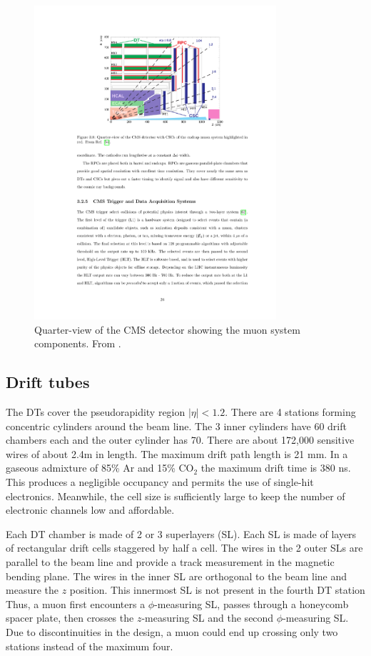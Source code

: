 \begin{figure}[hbtp]
\centering
\includegraphics[width=0.8\textwidth]{figures/cms_muon_systems.pdf}
\caption{
Quarter-view of the CMS detector showing the muon system components. 
From \cite{Chatrchyan:2008aa}.
}
\label{fig:muonsystem}
\end{figure}

\subsection{Drift tubes}
The DTs cover the pseudorapidity region $|\eta|<1.2$.
There are 4 stations forming concentric cylinders around the beam line.
The 3 inner cylinders have 60 drift chambers each and the outer cylinder has 70.
There are about 172,000 sensitive wires of about 2.4m in length.
The maximum drift path length is 21 mm. In a gaseous admixture of 85\% Ar and 15\% $\mathrm{CO}_2$ the maximum drift time is 380 ns.
This produces a negligible occupancy and permits the use of single-hit electronics.
Meanwhile, the cell size is sufficiently large to keep the number of electronic channels low and affordable.

Each DT chamber is made of 2 or 3 superlayers (SL).
Each SL is made of layers of rectangular drift cells staggered by half a cell.
The wires in the 2 outer SLs are parallel to the beam line and provide a track measurement
in the magnetic bending plane. 
The wires in the inner SL are orthogonal to the beam line and measure the $z$ position.
This innermost SL is not present in the fourth DT station
Thus, a muon first encounters a $\phi$-measuring SL, passes through a honeycomb spacer plate,
then crosses the $z$-measuring SL and the second $\phi$-measuring SL.
Due to discontinuities in the design,
a muon could end up crossing only two stations instead of the maximum four.

